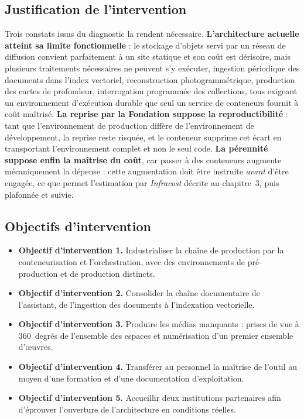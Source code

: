 \subsection{Justification de l'intervention}

Trois constats issus du diagnostic la rendent nécessaire.
\textbf{L'architecture actuelle atteint sa limite fonctionnelle} : le stockage
d'objets servi par un réseau de diffusion convient parfaitement à un site
statique et son coût est dérisoire, mais plusieurs traitements nécessaires ne
peuvent s'y exécuter, ingestion périodique des documents dans l'index vectoriel,
reconstruction photogrammétrique, production des cartes de profondeur,
interrogation programmée des collections, tous exigeant un environnement
d'exécution durable que seul un service de conteneurs fournit à coût maîtrisé.
\textbf{La reprise par la Fondation suppose la reproductibilité} : tant que
l'environnement de production diffère de l'environnement de développement, la
reprise reste risquée, et le conteneur supprime cet écart en transportant
l'environnement complet et non le seul code. \textbf{La pérennité suppose enfin
la maîtrise du coût}, car passer à des conteneurs augmente mécaniquement la
dépense : cette augmentation doit être instruite \emph{avant} d'être engagée,
ce que permet l'estimation par \emph{Infracost} décrite au chapitre~3, puis
plafonnée et suivie.

\subsection{Objectifs d'intervention}


\begin{itemize}[label={},leftmargin=0pt,itemsep=5pt,topsep=4pt,parsep=0pt]
  \item \textbf{Objectif d'intervention 1.} Industrialiser la chaîne de production par la
        conteneurisation et l'orchestration, avec des environnements de
        pré-production et de production distincts.
  \item \textbf{Objectif d'intervention 2.} Consolider la chaîne documentaire de l'assistant, de
        l'ingestion des documents à l'indexation vectorielle.
  \item \textbf{Objectif d'intervention 3.} Produire les médias manquants : prises de vue à
        360~degrés de l'ensemble des espaces et numérisation d'un premier
        ensemble d'œuvres.
  \item \textbf{Objectif d'intervention 4.} Transférer au personnel la maîtrise de l'outil au moyen
        d'une formation et d'une documentation d'exploitation.
  \item \textbf{Objectif d'intervention 5.} Accueillir deux institutions partenaires afin d'éprouver
        l'ouverture de l'architecture en conditions réelles.
\end{itemize}

